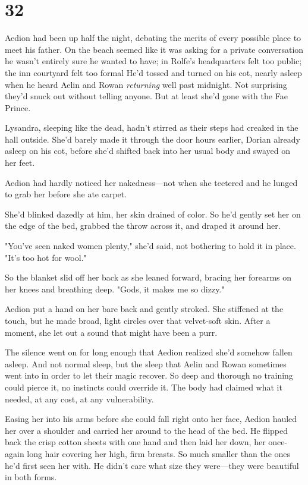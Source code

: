 
\chapter{32}

Aedion had been up half the night, debating the merits of every possible place to meet his father.
On the beach seemed like it was asking for a private conversation he wasn't entirely sure he wanted to have; in Rolfe's headquarters felt too public; the inn courtyard felt too formal  He'd tossed and turned on his cot, nearly asleep when he heard Aelin and Rowan \emph{returning} well past midnight.
Not surprising they'd snuck out without telling anyone.
But at least she'd gone with the Fae Prince.

Lysandra, sleeping like the dead, hadn't stirred as their steps had creaked in the hall outside.
She'd barely made it through the door hours earlier, Dorian already asleep on his cot, before she'd shifted back into her usual body and swayed on her feet.

Aedion had hardly noticed her nakedness---not when she teetered and he lunged to grab her before she ate carpet.

She'd blinked dazedly at him, her skin drained of color.
So he'd gently set her on the edge of the bed, grabbed the throw across it, and draped it around her.

"You've seen naked women plenty," she'd said, not bothering to hold it in place.
"It's too hot for wool."

So the blanket slid off her back as she leaned forward, bracing her forearms on her knees and breathing deep.
"Gods, it makes me so dizzy."

Aedion put a hand on her bare back and gently stroked.
She stiffened at the touch, but he made broad, light circles over that velvet-soft skin.
After a moment, she let out a sound that might have been a purr.

The silence went on for long enough that Aedion realized she'd somehow fallen asleep.
And not normal sleep, but the sleep that Aelin and Rowan sometimes went into in order to let their magic recover.
So deep and thorough no training could pierce it, no instincts could override it.
The body had claimed what it needed, at any cost, at any vulnerability.

Easing her into his arms before she could fall right onto her face, Aedion hauled her over a shoulder and carried her around to the head of the bed.
He flipped back the crisp cotton sheets with one hand and then laid her down, her once-again long hair covering her high, firm breasts.
So much smaller than the ones he'd first seen her with.
He didn't care what size they were---they were beautiful in both forms.

